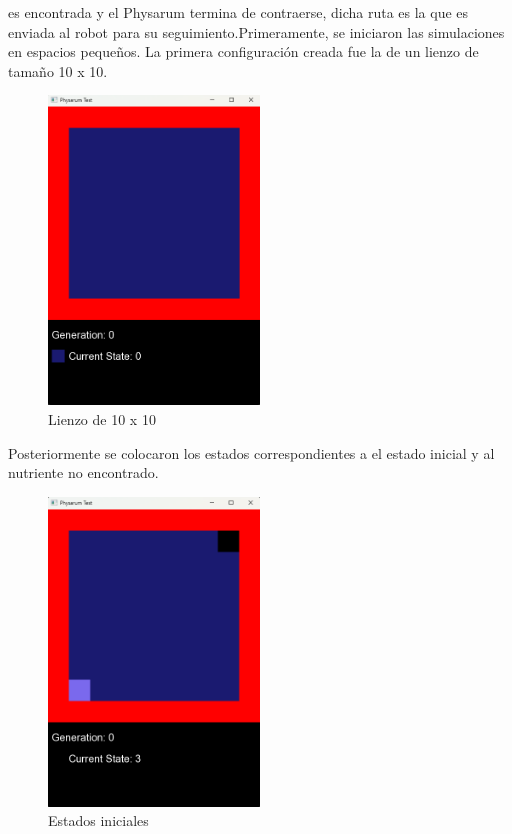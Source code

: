         es encontrada y el Physarum termina de contraerse, dicha
        ruta es la que es enviada al robot para su seguimiento.Primeramente, se iniciaron las simulaciones en espacios
        peque\~nos. La primera configuraci\'on creada fue la de un
        lienzo de tama\~no 10 x 10.
    \vskip 0.5cm
    \begin{figure}[htbp]
        \centering
        \includegraphics[width=0.5\textwidth]{./images/Pruebas/simulador/image001.png}
        \caption{Lienzo de 10 x 10}
        \label{fig:10x10}
    \end{figure}
    \vskip 0.5cm
    Posteriormente se colocaron los estados correspondientes a
    el estado inicial y al nutriente no encontrado.
    \vskip 0.5cm
    \begin{figure}[htbp]
        \centering
        \includegraphics[width=0.5\textwidth]{./images/Pruebas/simulador/image002.png}
        \caption{Estados iniciales}
        \label{fig:Estados iniciales}
    \end{figure}
